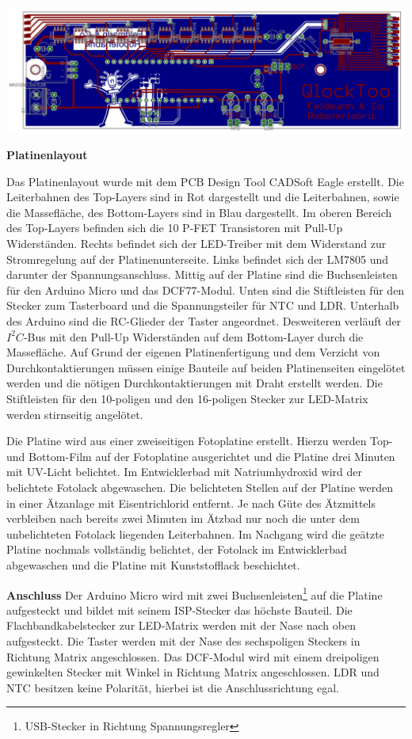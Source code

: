 {
\centering 
\includegraphics[width=\textwidth]{Abbildungen/Elektronik/Layout01} 
}
\begin{multicols}{2}

\textbf{Platinenlayout}

Das Platinenlayout wurde mit dem PCB Design Tool CADSoft Eagle erstellt. Die Leiterbahnen des Top-Layers sind in Rot dargestellt und die Leiterbahnen, sowie die Massefläche, des Bottom-Layers sind in Blau dargestellt. Im oberen Bereich des Top-Layers befinden sich die 10 P-FET Transistoren mit  Pull-Up Widerständen. Rechts befindet sich der LED-Treiber mit dem Widerstand zur Stromregelung auf der Platinenunterseite. Links befindet sich der LM7805 und darunter der Spannungsanschluss. Mittig auf der Platine sind die Buchsenleisten für den Arduino Micro und das DCF77-Modul. Unten sind die Stiftleisten für den Stecker zum Tasterboard und die Spannungsteiler für NTC und LDR. Unterhalb des Arduino sind die RC-Glieder der Taster angeordnet. Desweiteren verläuft der $I^{2}C$-Bus mit den Pull-Up Widerständen auf dem Bottom-Layer durch die Massefläche. Auf Grund der eigenen Platinenfertigung und dem Verzicht von Durchkontaktierungen müssen einige Bauteile auf beiden Platinenseiten eingelötet werden und die nötigen Durchkontaktierungen mit Draht erstellt werden. Die Stiftleisten für den 10-poligen und den 16-poligen Stecker zur LED-Matrix werden stirnseitig angelötet. 


Die Platine wird aus einer zweiseitigen Fotoplatine erstellt. Hierzu werden Top- und Bottom-Film auf der Fotoplatine ausgerichtet und die Platine drei Minuten mit UV-Licht belichtet. Im Entwicklerbad mit Natriumhydroxid wird der belichtete Fotolack abgewaschen. Die belichteten Stellen auf der Platine werden in einer Ätzanlage mit Eisentrichlorid entfernt. Je nach Güte des Ätzmittels verbleiben nach bereits zwei Minuten im Ätzbad nur noch die unter dem unbelichteten Fotolack liegenden Leiterbahnen. Im Nachgang wird die geätzte Platine nochmals vollständig belichtet, der Fotolack im Entwicklerbad abgewaschen und die Platine mit Kunststofflack beschichtet.

\textbf{Anschluss} Der Arduino Micro wird mit zwei Buchsenleisten\footnote{USB-Stecker in Richtung Spannungsregler} auf die Platine aufgesteckt und bildet mit seinem ISP-Stecker das höchste Bauteil. Die Flachbandkabelstecker zur LED-Matrix werden mit der Nase nach oben aufgesteckt. Die Taster werden mit der Nase des sechspoligen Steckers in Richtung Matrix angeschlossen. Das DCF-Modul wird mit einem dreipoligen gewinkelten Stecker mit Winkel in Richtung Matrix angeschlossen. LDR und NTC besitzen keine Polarität, hierbei ist die Anschlussrichtung egal.
\end{multicols}
